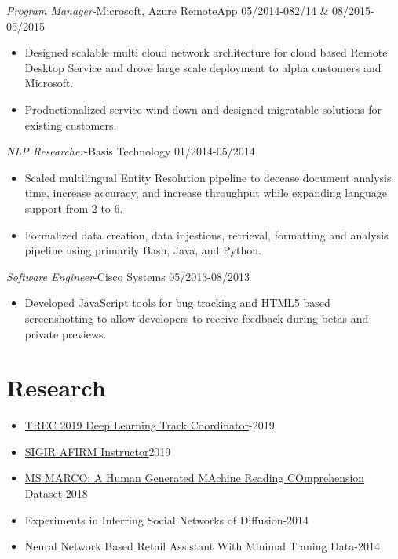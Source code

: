 \documentclass[line,margin]{res}
\begin{document}
\begin{resume}
\begin{itemize}
\end{itemize}
{\sl Program Manager}-Microsoft, Azure RemoteApp  \hfill 05/2014-082/14 \& 08/2015-05/2015
\begin{itemize}  \itemsep -4pt
\item Designed scalable multi cloud network architecture for cloud based Remote Desktop Service and drove large scale deployment to alpha customers and Microsoft.
\item Productionalized service wind down and designed migratable solutions for existing customers.
\end{itemize}
{\sl NLP Researcher}-Basis Technology \hfill 01/2014-05/2014
\begin{itemize}  \itemsep -4pt
\item Scaled multilingual Entity Resolution pipeline to decease document analysis time, increase accuracy, and increase throughput while expanding language support from 2 to 6.
\item Formalized data creation, data injestions, retrieval, formatting and analysis pipeline using primarily Bash, Java, and Python.
\end{itemize}
{\sl Software Engineer}-Cisco Systems \hfill 05/2013-08/2013
\begin{itemize}  \itemsep -4pt
\item Developed JavaScript tools for bug tracking and HTML5 based screenshotting to allow developers to receive feedback during betas and private previews. 
\end{itemize}
\section{Research}
\begin{itemize} 
\itemsep -5pt
\item  \href{https://trec.nist.gov/pubs/call2019.html}{TREC 2019 Deep Learning Track Coordinator}-2019
\item  \href{http://sigir.org/afirm2019/}{SIGIR AFIRM Instructor}2019
\item \href{https://arxiv.org/pdf/1611.09268.pdf}{MS MARCO: A Human Generated MAchine Reading COmprehension Dataset}-2018
\item Experiments in Inferring Social Networks of Diffusion-2014
\item Neural Network Based Retail Assistant With Minimal Traning Data-2014
\end{itemize}
\end{resume}
\end{document}
